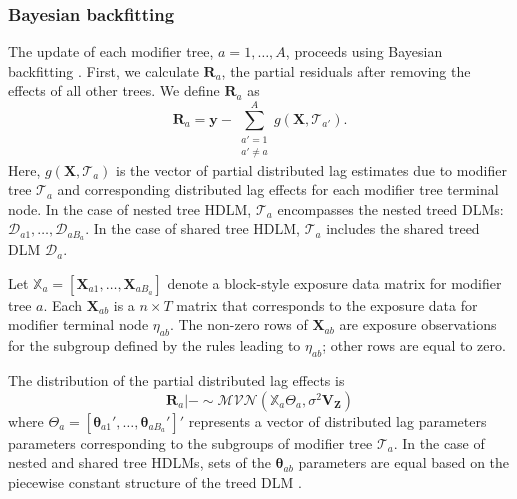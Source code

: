\documentclass[12pt]{article}
\begin{document}
\subsubsection{Bayesian backfitting}
The update of each modifier tree, $a=1,\ldots,A$, proceeds using Bayesian backfitting \citep{Hastie2000}. First, we calculate $\mathbf{R}_a$, the partial residuals after removing the effects of all other trees. We define $\mathbf{R}_a$ as
\begin{equation}\label{eq:dlm-resid}
    \mathbf{R}_{a}=\mathbf{y}-\sum_{\substack{a'=1\\a'\not=a}}^A g(\mathbf{X}, \mathcal{T}_{a'}).
\end{equation}
Here, $g(\mathbf{X}, \mathcal{T}_{a})$ is the vector of partial distributed lag estimates due to modifier tree $\mathcal{T}_{a}$ and corresponding distributed lag effects for each modifier tree terminal node. In the case of nested tree HDLM, $\mathcal{T}_{a}$ encompasses the nested treed DLMs: $\mathcal{D}_{a1},\ldots,\mathcal{D}_{aB_a}$. In the case of shared tree HDLM, $\mathcal{T}_a$ includes the shared treed DLM $\mathcal{D}_a$.

Let $\mathbb{X}_a=[\mathbf{X}_{a1},\ldots,\mathbf{X}_{aB_a}]$ denote a block-style exposure data matrix for modifier tree $a$. Each $\mathbf{X}_{ab}$ is a $n\times T$ matrix that corresponds to the exposure data for modifier terminal node $\eta_{ab}$. The non-zero rows of $\mathbf{X}_{ab}$ are exposure observations for the subgroup defined by the rules leading to $\eta_{ab}$; other rows are equal to zero.

The distribution of the partial distributed lag effects is
\begin{equation}
    \label{eq:Ra-partial-dlnm-dist}
    \mathbf{R}_a|- \sim \mathcal{MVN}\left(\mathbb{X}_a\Theta_{a},\sigma^2\mathbf{V_Z} \right)
\end{equation}
where $\Theta_a=[\boldsymbol\theta_{a1}',\ldots,\boldsymbol\theta_{aB_a}']'$ represents a vector of distributed lag parameters parameters corresponding to the subgroups of modifier tree $\mathcal{T}_a$. In the case of nested and shared tree HDLMs, sets of the $\boldsymbol\theta_{ab}$ parameters are equal based on the piecewise constant structure of the treed DLM \citep{Mork2023EstimatingPairs}.
    
\end{document}
